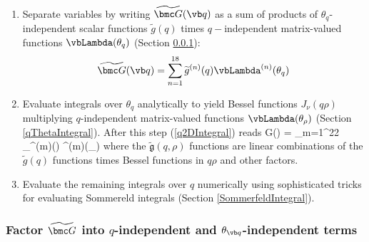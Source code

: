 \documentclass[letterpaper]{article}
\renewcommand{\wt}{\widetilde}
\begin{document}
\begin{enumerate}
 \item Separate variables by writing $\wt{\bmc G}(\vb q)$ as a sum of
       products of $\theta_{q}$-independent scalar functions
       $\wt g(q)$ times $q-$independent matrix-valued functions
       $\vbLambda(\theta_{q})$ (Section \ref{wtGDecomposition}):
       $$ \wt{\bmc G}(\vb q)=\sum_{n=1}^{18}
          \wt{g}^{(n)}(q) \vbLambda^{(n)}(\theta_{q})
       $$
 \item Evaluate integrals over $\theta_{q}$ analytically to yield
       Bessel functions $J_\nu(q\rho)$ multiplying $q$-independent
       matrix-valued functions $\vbLambda(\theta_{\rho})$
       (Section \ref{qThetaIntegral}).
       After this step (\ref{q2DIntegral}) reads
        { \bmc G(\vbrho)
           = \sum_{m=1}^{22}
             \underbrace{
               \left[ \int_{0}^\infty \wt{\mathfrak{g}}^{(m)}(q,\rho)\,dq\right]
                        }_{^{(m)}(\rho)}
             \vbLambda^{(m)}(\theta_{\rho})
        }
       where the $\wt{\mathfrak{g}}(q,\rho)$ functions are linear combinations
       of the $\wt{g}(q)$ functions times Bessel functions in $q\rho$
       and other factors.
 \item Evaluate the remaining integrals over $q$ numerically
       using sophisticated tricks for evaluating Sommereld
       integrals (Section \ref{SommerfeldIntegral}).
\end{enumerate}

\subsubsection{Factor $\wt{\bmc G}$ into $q$-independent and $\theta_{\vb q}$-independent terms}
\label{wtGDecomposition}
\end{document}
